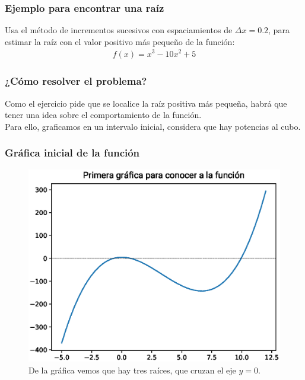 \documentclass[12pt]{beamer}
\begin{document}
\begin{frame}
\frametitle{Ejemplo para encontrar una raíz}
Usa el método de incrementos sucesivos con espaciamientos de $\Delta x = 0.2$, para estimar la raíz con el valor positivo más pequeño de la función:
\pause
\begin{align*}
f (x) = x^{3} - 10 x^{2} + 5
\end{align*}
\end{frame}
\begin{frame}
\frametitle{¿Cómo resolver el problema?}
Como el ejercicio pide que se localice la raíz positiva más pequeña, habrá que tener una idea sobre el comportamiento de la función.
\\
\bigskip
\pause
Para ello, graficamos en un intervalo inicial, considera que hay potencias al cubo.
\end{frame}
\begin{frame}
\frametitle{Gráfica inicial de la función}
\begin{figure}
	\centering
	\includegraphics[scale=0.5]{Imagenes/aprox_sucesivas_01.eps}
	\caption{De la gráfica vemos que hay tres raíces, que cruzan el eje $y = 0$.} 
\end{figure}
\end{frame}
\end{document}
